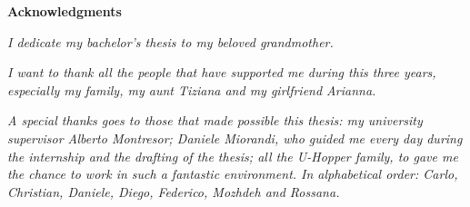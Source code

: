 \thispagestyle{empty}

\begin{center}
  {\bf \Huge Acknowledgments}
\end{center}

\vspace{4cm}


\emph{I dedicate my bachelor's thesis to my beloved grandmother.}

\emph{I want to thank all the people that have supported me during this three years, especially my family, my aunt Tiziana and my girlfriend Arianna.}

\emph{A special thanks goes to those that made possible this thesis: my university supervisor Alberto Montresor; Daniele Miorandi, who guided me every day during the internship and the drafting of the thesis; all the U-Hopper family, to gave me the chance to work in such a fantastic environment. In alphabetical order: Carlo, Christian, Daniele, Diego, Federico, Mozhdeh and Rossana.}
